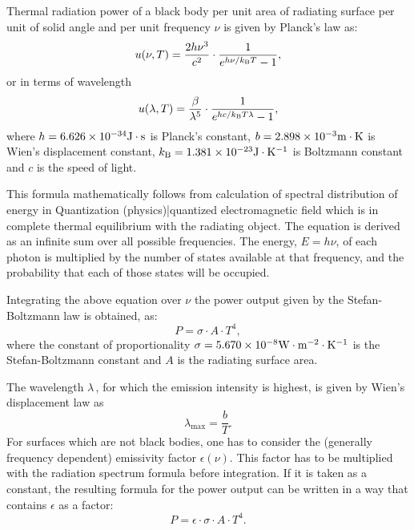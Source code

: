 Thermal radiation power of a black body per unit area of radiating surface per unit of solid angle and per unit frequency $\nu$ is given by Planck's law as:
\begin{equation}
u(\nu,T)=\frac{2 h\nu^3}{c^2}\cdot\frac1{e^{h\nu/k_{\rm{B}}T}-1},
\end{equation}
or in terms of wavelength
\begin{equation}
u(\lambda,T)=\frac{\beta}{\lambda^5}\cdot\frac1{e^{hc/k_{\rm{B}}T\lambda}-1},
\end{equation}
where $h=6.626\times10^{-34}{\rm{J}}\cdot {\rm{s}}$ is Planck's constant, $b=2.898\times10^{-3}{\rm{m}} \cdot {\rm{K}}$ is Wien's displacement constant, $k_{\rm{B}}=1.381\times10^{-23}{\rm{J}} \cdot {\rm{K}}^{-1}$ is Boltzmann constant and $c$ is the speed of light.

This formula mathematically follows from calculation of spectral distribution of energy in Quantization (physics)|quantized electromagnetic field which is in complete thermal equilibrium with the radiating object. The equation is derived as an infinite sum over all possible frequencies. The energy, $E=h \nu$, of each photon is multiplied by the number of states available at that frequency, and the probability that each of those states will be occupied.

Integrating the above equation over $\nu$ the power output given by the Stefan-Boltzmann law is obtained, as:
\begin{equation}
P = \sigma \cdot A \cdot T^4,
\label{Equ:IntegratingOfStefanBoltzmann}
\end{equation}
where the constant of proportionality $\sigma=5.670\times10^{-8}\rm{W}\cdot \rm{m}^{-2}\cdot \rm{K}^{-1}$ is the Stefan-Boltzmann constant and $A$ is the radiating surface area.

The wavelength $\lambda \,$, for which the emission intensity is highest, is given by Wien's displacement law as
\begin{equation}
\lambda_{\max} = \frac{b}{T}.
\end{equation}
For surfaces which are not black bodies, one has to consider the (generally frequency dependent) emissivity factor $\epsilon(\nu)$. This factor has to be multiplied with the radiation spectrum formula before integration. If it is taken as a constant, the resulting formula for the power output can be written in a way that contains $\epsilon$ as a factor:
\begin{equation}
P = \epsilon \cdot \sigma \cdot A \cdot T^4.
\end{equation}


